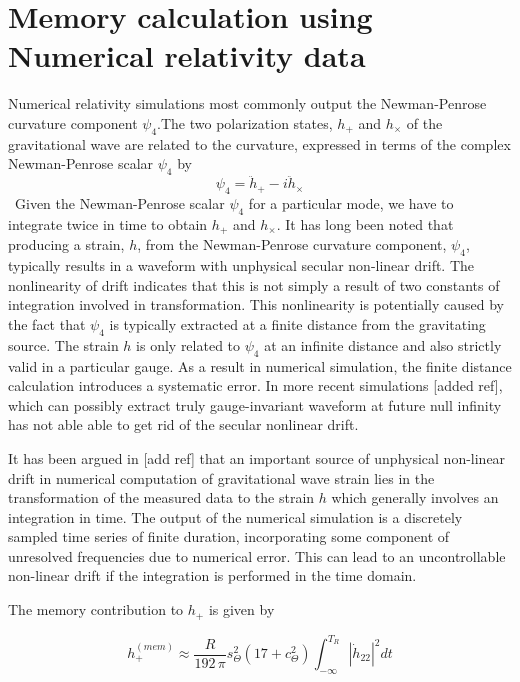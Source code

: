 \documentclass[prd,preprintnumbers,twocolumn,eqsecnum,floatfix,letter]{revtex4}
\begin{document}
\section{Memory calculation using Numerical relativity data}
Numerical relativity simulations most commonly output the Newman-Penrose curvature component $\psi_4$.The two polarization states, $h_{+}$ and $h_{\times}$ of the gravitational wave are related to the curvature, expressed in terms 	of the complex Newman-Penrose scalar $\psi_4$ by 
\begin{equation}
	\psi_4 = \ddot{h}_+ - \mathit{i}\ddot{h}_{\times}
\end{equation}\
Given the Newman-Penrose scalar $\psi_4$ for a particular mode, we have to integrate twice in time to obtain $h_{+}$ and $h_{\times}$. It has long been noted that producing a strain, $h$, from the Newman-Penrose curvature component, $\psi_4$, typically results in a waveform with unphysical secular non-linear drift. The nonlinearity of drift indicates that this is not simply a result of two constants of integration involved in transformation. This nonlinearity is potentially caused by the fact that $\psi_4$ is typically extracted at a finite distance from the gravitating source. The strain $h$ is only related to $\psi_4$ at an infinite distance and also strictly valid in a particular gauge. As a result in numerical simulation, the finite distance calculation introduces a systematic error. In more recent simulations [added ref], which can possibly extract truly gauge-invariant waveform at future null infinity has not able able to get rid of the secular nonlinear drift.
\par It has been argued in [add ref] that an important source of unphysical non-linear drift in numerical computation of gravitational wave strain lies in the transformation of the measured data to the strain $h$  which generally involves an integration in time. The output of the numerical simulation is a discretely sampled time series of finite duration, incorporating some component of unresolved frequencies due to numerical error. This can lead to an uncontrollable non-linear drift if the integration is performed in the time domain. 
\par The memory contribution to $h_{+}$ is given by 

\begin{equation}
	h_{+}^{(mem)} \approx \frac{R}{192 \, \pi}s_{\Theta}^{2}\left(17 +c_{\Theta}^{2} \right)\int_{-\infty}^{T_R}|\dot{h}_{22}|^2 dt
\end{equation}
\end{document}
